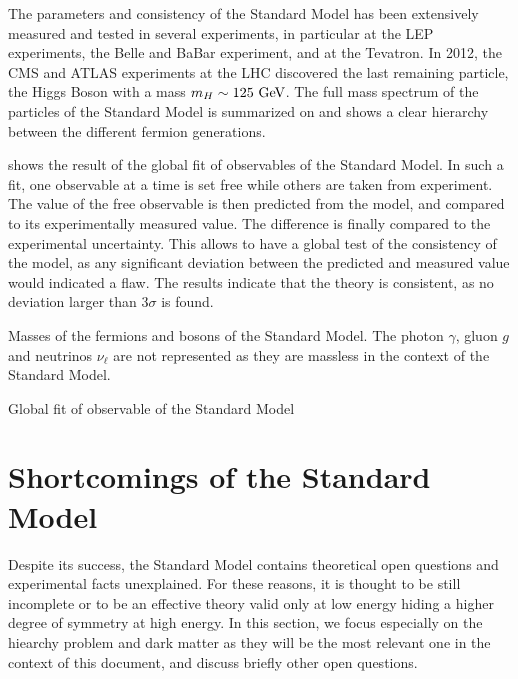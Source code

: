     The parameters and consistency of the Standard
    Model has been extensively measured and tested in several experiments, in particular
    at the LEP experiments, the Belle and BaBar experiment, and at the Tevatron. In 2012,
    the CMS and ATLAS experiments at the LHC discovered the last remaining particle, the
    Higgs Boson with a mass $m_H \sim 125~\text{GeV}$. The full mass spectrum of the particles
    of the Standard Model is summarized on  and
    shows a clear hierarchy between the different fermion generations.

     shows the result of the global fit of
    observables of the Standard Model. In such a fit, one observable at a time is set free
    while others are taken from experiment. The value of the free observable is then
    predicted from the model, and compared to its experimentally measured value. The
    difference is finally compared to the experimental uncertainty. This allows to have a
    global test of the consistency of the model, as any significant deviation between the
    predicted and measured value would indicated a flaw. The results indicate that the theory
    is consistent, as no deviation larger than 3$\sigma$ is found.

                 {Masses of the fermions and bosons of the Standard Model. The photon
                 $\gamma$, gluon $g$ and neutrinos $\nu_\ell$ are not represented as they
                 are massless in the context of the Standard Model.}

                  {Global fit of observable of the Standard Model}

    \section{Shortcomings of the Standard Model}

    Despite its success, the Standard Model contains theoretical open questions and
    experimental facts unexplained. For these reasons, it is thought to be still incomplete
    or to be an effective theory valid only at low energy hiding a higher
    degree of symmetry at high energy. In this section, we focus especially on the hiearchy
    problem and dark matter as they will be the most relevant one in the context of this
    document, and discuss briefly other open questions.

